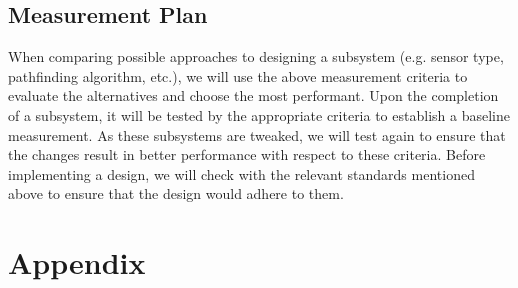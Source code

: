 \documentclass[10pt]{article}
\begin{document}
\subsection*{Measurement Plan}
When comparing possible approaches to designing a subsystem (e.g. sensor type, pathfinding algorithm, etc.), we will use the above measurement criteria to evaluate the alternatives and choose the most performant. Upon the completion of a subsystem, it will be tested by the appropriate criteria to establish a baseline measurement. As these subsystems are tweaked, we will test again to ensure that the changes result in better performance with respect to these criteria. Before implementing a design, we will check with the relevant standards mentioned above to ensure that the design would adhere to them.

\section*{Appendix}
\end{document}
